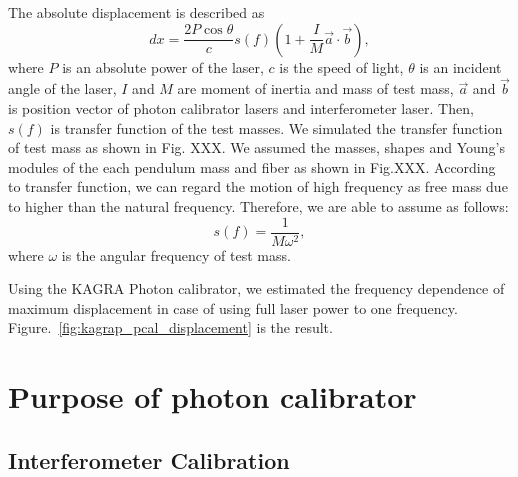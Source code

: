 
The absolute displacement is described as
\begin{equation}
dx=\frac{2 P \cos{\theta}}{c} s(f) \left( 1+\frac{I}{M}\vec{a}\cdot \vec{b}\right), \label{eq:dx}
\end{equation}
where $P$ is an absolute power of the laser, $c$ is the speed of light, $\theta$  is an incident angle of the laser, $I$ and $M$ are moment of inertia and mass of test mass, $\vec{a}$ and $\vec{b}$ is position vector of photon calibrator lasers and interferometer laser. Then, $s(f)$ is transfer function of the test masses. We simulated the transfer function of test mass as shown in Fig. XXX. We assumed the masses, shapes and Young's modules of the each pendulum mass and fiber as shown in Fig.XXX. According to transfer function, we can regard the motion of high frequency as free mass due to higher than the natural frequency. Therefore, we are able to assume as follows:
\begin{equation}
s(f)=\frac{1}{M \omega^2},
\end{equation}
where $\omega$ is the angular frequency of test mass.

Using the KAGRA Photon calibrator, we estimated the frequency dependence of maximum displacement 
in case of using full laser power to one frequency. Figure.~\ref{fig:kagrap_pcal_displacement} is the result.
 

\section{Purpose of photon calibrator}
\subsection{Interferometer Calibration}

